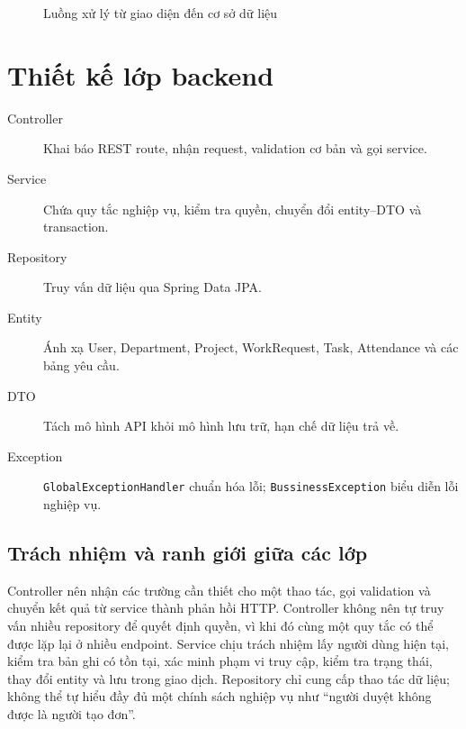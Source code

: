 \documentclass[12pt,a4paper,oneside]{report}
\newcommand{\code}[1]{\texttt{#1}}
\begin{document}
\begin{figure}[H]\centering
{}
\caption{Luồng xử lý từ giao diện đến cơ sở dữ liệu}\label{fig:architecture}
\end{figure}

\section{Thiết kế lớp backend}
\begin{description}
\item[Controller] Khai báo REST route, nhận request, validation cơ bản và gọi service.
\item[Service] Chứa quy tắc nghiệp vụ, kiểm tra quyền, chuyển đổi entity--DTO và transaction.
\item[Repository] Truy vấn dữ liệu qua Spring Data JPA.
\item[Entity] Ánh xạ User, Department, Project, WorkRequest, Task, Attendance và các bảng yêu cầu.
\item[DTO] Tách mô hình API khỏi mô hình lưu trữ, hạn chế dữ liệu trả về.
\item[Exception] \code{GlobalExceptionHandler} chuẩn hóa lỗi; \code{BussinessException} biểu diễn lỗi nghiệp vụ.
\end{description}

\subsection{Trách nhiệm và ranh giới giữa các lớp}
Controller nên nhận các trường cần thiết cho một thao tác, gọi validation và chuyển kết quả từ service thành phản hồi HTTP. Controller không nên tự truy vấn nhiều repository để quyết định quyền, vì khi đó cùng một quy tắc có thể được lặp lại ở nhiều endpoint. Service chịu trách nhiệm lấy người dùng hiện tại, kiểm tra bản ghi có tồn tại, xác minh phạm vi truy cập, kiểm tra trạng thái, thay đổi entity và lưu trong giao dịch. Repository chỉ cung cấp thao tác dữ liệu; không thể tự hiểu đầy đủ một chính sách nghiệp vụ như ``người duyệt không được là người tạo đơn''.
\end{document}
